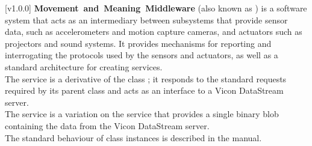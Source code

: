 [v1.0.0]
\textbf{Movement~and~Meaning~Middleware} (also known as \mplusm) is a software system
that acts as an intermediary between subsystems that provide sensor data, such as
accelerometers and motion capture cameras, and actuators such as projectors and sound
systems.
It provides mechanisms for reporting and interrogating the protocols used by the sensors
and actuators, as well as a standard architecture for creating services.\\

The \VDSI{} service is a derivative of the \mplusm{} class ;
it responds to the standard requests required by its parent class and acts as an interface
to a Vicon DataStream server.\\

The \VBI{} service is a variation on the \VDSI{} service that provides a single binary
blob containing the data from the Vicon DataStream server.\\

The standard behaviour of  class instances is described in
the \emph{\MMM} manual.
\primaryEnd{}

